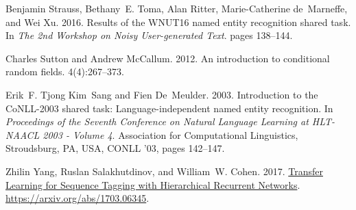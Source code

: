 \documentclass[11pt,letterpaper]{article}
\begin{document}
\begin{thebibliography}{}
Benjamin Strauss, Bethany~E. Toma, Alan Ritter, Marie-Catherine de~Marneffe,
  and Wei Xu. 2016.
\newblock Results of the {WNUT16} named entity recognition shared task.
\newblock In {\em The 2nd Workshop on Noisy User-generated Text\/}. pages
  138--144.

Charles Sutton and Andrew McCallum. 2012.
\newblock An introduction to conditional random fields.
 4(4):267--373.

Erik~F. Tjong Kim~Sang and Fien De~Meulder. 2003.
\newblock Introduction to the {CoNLL-2003} shared task: Language-independent
  named entity recognition.
\newblock In {\em Proceedings of the Seventh Conference on Natural Language
  Learning at HLT-NAACL 2003 - Volume 4\/}. Association for Computational
  Linguistics, Stroudsburg, PA, USA, CONLL '03, pages 142--147.

Zhilin {Yang}, Ruslan {Salakhutdinov}, and William~W. {Cohen}. 2017.
\newblock \href{https://arxiv.org/abs/1703.06345}{{Transfer Learning for
  Sequence Tagging with Hierarchical Recurrent Networks}}.
  \href{https://arxiv.org/abs/1703.06345}{https://arxiv.org/abs/1703.06345}.

\end{thebibliography}
\end{document}
